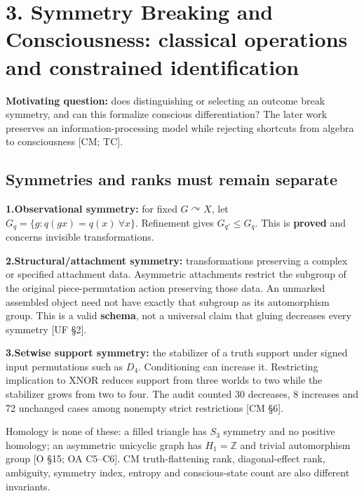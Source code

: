 \documentclass[10pt,letterpaper]{article}
\begin{document}
\section*{3. Symmetry Breaking and Consciousness: classical operations and constrained identification}

\textbf{Motivating question:} does distinguishing or selecting an outcome break symmetry, and can this formalize conscious differentiation? The later work preserves an information-processing model while rejecting shortcuts from algebra to consciousness [CM; TC].\par

\subsection*{Symmetries and ranks must remain separate}

\noindent\textbf{1.}\quad \textbf{Observational symmetry:} for fixed \(G\curvearrowright X\), let \(G_q=\{g:q(gx)=q(x)\ \forall x\}\). Refinement gives \(G_{q'}\le G_q\). This is \textbf{proved} and concerns invisible transformations.\par
\noindent\textbf{2.}\quad \textbf{Structural/attachment symmetry:} transformations preserving a complex or specified attachment data. Asymmetric attachments restrict the subgroup of the original piece-permutation action preserving those data. An unmarked assembled object need not have exactly that subgroup as its automorphism group. This is a valid \textbf{schema}, not a universal claim that gluing decreases every symmetry [UF \S{}2].\par
\noindent\textbf{3.}\quad \textbf{Setwise support symmetry:} the stabilizer of a truth support under signed input permutations such as \(D_4\). Conditioning can increase it. Restricting implication to XNOR reduces support from three worlds to two while the stabilizer grows from two to four. The audit counted 30 decreases, 8 increases and 72 unchanged cases among nonempty strict restrictions [CM \S{}6].\par

Homology is none of these: a filled triangle has \(S_3\) symmetry and no positive homology; an asymmetric unicyclic graph has \(H_1=\mathbb Z\) and trivial automorphism group [O \S{}15; OA C5--C6]. CM truth-flattening rank, diagonal-effect rank, ambiguity, symmetry index, entropy and conscious-state count are also different invariants.\par
\end{document}
